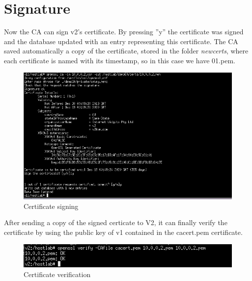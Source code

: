 \documentclass[11pt]{article}
\begin{document}
\section{Signature}
Now the CA can sign v2's certificate. By pressing ”y” the certiﬁcate was signed and the database updated with an entry representing this certiﬁcate.  The CA saved automatically a copy of the certiﬁcate, stored in the folder \textit{newcerts}, where each certiﬁcate is named with its timestamp, so in this case we have 01.pem. \\
\begin{figure}[H]
	\includegraphics[width=1\textwidth]{img14-hw7-1743261.png}
	\caption{Certificate signing}
\end{figure}
After sending a copy of the signed certicate to V2, it can finally verify the certiﬁcate by using the public key of v1 contained in the cacert.pem certiﬁcate.\\
\begin{figure}[H]
	\includegraphics[width=1\textwidth]{img15-hw7-1743261.png}
	\caption{Certificate verification}
\end{figure}
\end{document}
